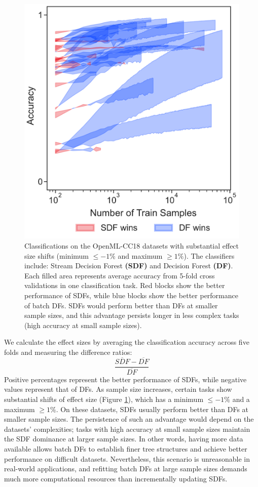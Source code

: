 \begin{figure}[!htb]
\centering
\includegraphics[width=0.4\columnwidth]{cc18_fill}
  \caption{Classifications on the OpenML-CC18 datasets with substantial effect size shifts (minimum $\leq -1\%$ and maximum $\geq 1\%$). The classifiers include: Stream Decision Forest \textbf{(SDF)} and Decision Forest \textbf{(DF)}. 
  Each filled area represents average accuracy from 5-fold cross validations in one classification task. Red blocks show the better performance of SDFs, while blue blocks show the better performance of batch DFs. SDFs would perform better than DFs at smaller sample sizes, and this advantage persists longer in less complex tasks (high accuracy at small sample sizes).
  }
\label{fig:cc18_fill}
\end{figure}

We calculate the effect sizes by averaging the classification accuracy across five folds and measuring the difference ratios:
\begin{equation*} \frac{\overline{SDF} - \overline{DF}}{\overline{DF}} \tag{2} \end{equation*}
Positive percentages represent the better performance of SDFs, while negative values represent that of DFs. 
As sample size increases, certain tasks show substantial shifts of effect size (Figure \ref{fig:cc18_fill}), which has a minimum $\leq -1\%$ and a maximum $\geq 1\%$. 
On these datasets, SDFs usually perform better than DFs at smaller sample sizes. The persistence of such an advantage would depend on the datasets' complexities; tasks with high accuracy at small sample sizes maintain the SDF dominance at larger sample sizes. In other words, having more data available allows batch DFs to establish finer tree structures and achieve better performance on difficult datasets. 
Nevertheless, this scenario is unreasonable in real-world applications, and refitting batch DFs at large sample sizes demands much more computational resources than incrementally updating SDFs.

